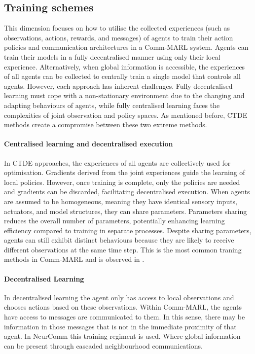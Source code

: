 \documentclass{article}
\begin{document}
\subsection{Training schemes}

This dimension focuses on how to utilise the collected experiences (such as observations, actions, rewards, and messages) of agents to train their action policies and communication architectures in a Comm-MARL system. Agents can train their models in a fully decentralised manner using only their local experience. Alternatively, when global information is accessible, the experiences of all agents can be collected to centrally train a single model that controls all agents. However, each approach has inherent challenges. Fully decentralised learning must cope with a non-stationary environment due to the changing and adapting behaviours of agents, while fully centralised learning faces the complexities of joint observation and policy spaces. As mentioned before, CTDE methods create a compromise between these two extreme methods.

\paragraph{Centralised learning and decentralised execution} In CTDE approaches, the experiences of all agents are collectively used for optimisation. Gradients derived from the joint experiences guide the learning of local policies. However, once training is complete, only the policies are needed and gradients can be discarded, facilitating decentralised execution. When agents are assumed to be homogeneous, meaning they have identical sensory inputs, actuators, and model structures, they can share parameters. Parameters sharing reduces the overall number of parameters, potentially enhancing learning efficiency compared to training in separate processes. Despite sharing parameters, agents can still exhibit distinct behaviours because they are likely to receive different observations at the same time step. This is the most common traning methods in Comm-MARL and is observed in \citet{foerster2016learning, sukhbaatar2016commnet, singh2018ic3net}. 


\paragraph{Decentralised Learning} In decentralised learning the agent only has access to local observations and chooses actions based on these observations. Within Comm-MARL, the agents have access to messages are communicated to them. In this sense, there may be information in those messages that is not in the immediate proximity of that agent. In NeurComm \citep{chu2020NeurComm} this training regiment is used. Where global information can be present through cascaded neighbourhood communications.
\end{document}
